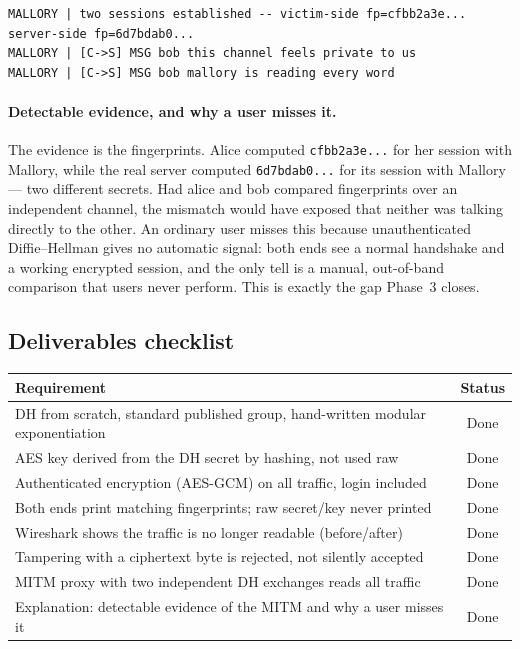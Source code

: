 \documentclass[11pt,a4paper]{article}
\begin{document}
\begin{lstlisting}
MALLORY | two sessions established -- victim-side fp=cfbb2a3e...  server-side fp=6d7bdab0...
MALLORY | [C->S] MSG bob this channel feels private to us
MALLORY | [C->S] MSG bob mallory is reading every word
\end{lstlisting}

\paragraph{Detectable evidence, and why a user misses it.} The evidence is the fingerprints. Alice
computed \texttt{cfbb2a3e...} for her session with Mallory, while the real server computed
\texttt{6d7bdab0...} for its session with Mallory --- two different secrets. Had alice and bob compared
fingerprints over an independent channel, the mismatch would have exposed that neither was talking
directly to the other. An ordinary user misses this because unauthenticated Diffie--Hellman gives no
automatic signal: both ends see a normal handshake and a working encrypted session, and the only tell
is a manual, out-of-band comparison that users never perform. This is exactly the gap Phase~3 closes.

\subsection{Deliverables checklist}

\begin{center}
\small
\begin{tabular}{@{}lc@{}}
\toprule
\textbf{Requirement} & \textbf{Status} \\
\midrule
DH from scratch, standard published group, hand-written modular exponentiation & Done \\
AES key derived from the DH secret by hashing, not used raw & Done \\
Authenticated encryption (AES-GCM) on all traffic, login included & Done \\
Both ends print matching fingerprints; raw secret/key never printed & Done \\
Wireshark shows the traffic is no longer readable (before/after) & Done \\
Tampering with a ciphertext byte is rejected, not silently accepted & Done \\
MITM proxy with two independent DH exchanges reads all traffic & Done \\
Explanation: detectable evidence of the MITM and why a user misses it & Done \\
\bottomrule
\end{tabular}
\end{center}
\end{document}
